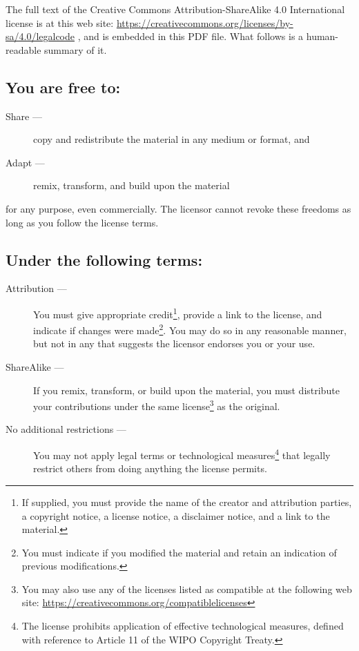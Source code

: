 \documentclass[letterpaper,twoside]{article}
\begin{document}
The full text of the Creative Commons Attribution-ShareAlike 4.0
International license is at this web site:
\url{https://creativecommons.org/licenses/by-sa/4.0/legalcode}%
, and is embedded in this
PDF file.  What follows is a human-readable summary of it.

\subsection{You are free to:}
\begin{description}
\item[Share ---]copy and redistribute the material in any medium or format, and
\item[Adapt ---]remix, transform, and build upon the material
\end{description}
for any purpose, even commercially.  The licensor cannot revoke these
freedoms as long as you follow the license terms.
\subsection{Under the following terms:}
\begin{description}
\item[Attribution ---]You must give appropriate credit\footnote{If supplied,
  you must provide the name of the creator and attribution parties,
  a copyright notice, a license notice, a disclaimer notice, and a link
  to the material.}, provide a link to
  the license, and indicate if changes were made\footnote{You must indicate if
    you modified the material and retain an indication of previous
    modifications.}.  You may do so in any
  reasonable manner, but not in any that suggests the licensor endorses you
  or your use.
\item[ShareAlike ---]If you remix, transform, or build upon the material,
  you must distribute your contributions under the same
  license\footnote{You may also use any of the licenses listed as compatible
    at the following web site:
    \url{https://creativecommons.org/compatiblelicenses}}
  as the original.
\item[No additional restrictions ---]You may not apply legal terms or
  technological measures\footnote{The license prohibits application of
    effective technological measures, defined with reference to Article 11
    of the WIPO Copyright Treaty.}
  that legally restrict others from doing anything
  the license permits.
\end{description}
\end{document}
